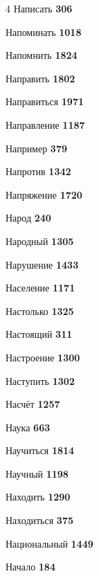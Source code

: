 \begin{multicols}{4}
\noindent Написать \dotfill \textbf{\color{secondary} 306}\par
\noindent Напоминать \dotfill \textbf{\color{secondary} 1018}\par
\noindent Напомнить \dotfill \textbf{\color{secondary} 1824}\par
\noindent Направить \dotfill \textbf{\color{secondary} 1802}\par
\noindent Направиться \dotfill \textbf{\color{secondary} 1971}\par
\noindent Направление \dotfill \textbf{\color{secondary} 1187}\par
\noindent Например \dotfill \textbf{\color{secondary} 379}\par
\noindent Напротив \dotfill \textbf{\color{secondary} 1342}\par
\noindent Напряжение \dotfill \textbf{\color{secondary} 1720}\par
\noindent Народ \dotfill \textbf{\color{secondary} 240}\par
\noindent Народный \dotfill \textbf{\color{secondary} 1305}\par
\noindent Нарушение \dotfill \textbf{\color{secondary} 1433}\par
\noindent Население \dotfill \textbf{\color{secondary} 1171}\par
\noindent Настолько \dotfill \textbf{\color{secondary} 1325}\par
\noindent Настоящий \dotfill \textbf{\color{secondary} 311}\par
\noindent Настроение \dotfill \textbf{\color{secondary} 1300}\par
\noindent Наступить \dotfill \textbf{\color{secondary} 1302}\par
\noindent Насчёт \dotfill \textbf{\color{secondary} 1257}\par
\noindent Наука \dotfill \textbf{\color{secondary} 663}\par
\noindent Научиться \dotfill \textbf{\color{secondary} 1814}\par
\noindent Научный \dotfill \textbf{\color{secondary} 1198}\par
\noindent Находить \dotfill \textbf{\color{secondary} 1290}\par
\noindent Находиться \dotfill \textbf{\color{secondary} 375}\par
\noindent Национальный \dotfill \textbf{\color{secondary} 1449}\par
\noindent Начало \dotfill \textbf{\color{secondary} 184}\par

\end{multicols}
